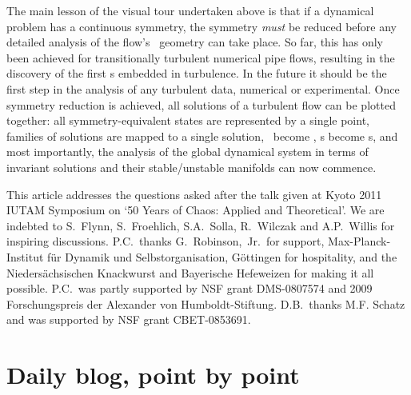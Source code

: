 \documentclass[aip,cha,reprint,
secnumarabic,
nofootinbib, tightenlines,
nobibnotes, showkeys, showpacs,
groupedaddress
]{revtex4-1}
\begin{document}
The main lesson of the visual tour undertaken above is that if a
dynamical problem has a continuous symmetry, the symmetry \emph{must} be
reduced before any detailed analysis of the flow's \statesp\ geometry can
take place. So far, this has only been achieved for transitionally
turbulent numerical pipe flows, resulting in the discovery of
the first \rpo s embedded in turbulence. In the future it should be the
first step in the analysis of any turbulent data, numerical or
experimental. Once symmetry reduction is achieved, all
solutions of a turbulent flow can be plotted together: all
symmetry-equivalent states are represented by a single point, families of
solutions are mapped to a single solution, \reqva\ become \eqva, \rpo s
become \po s, and most importantly, the analysis of the global dynamical
system in terms of invariant solutions and their stable/unstable
manifolds can now commence.

\begin{acknowledgments}
This article addresses the questions asked after the talk given at
Kyoto 2011 IUTAM Symposium on `50 Years of Chaos: Applied and Theoretical'.
We are indebted to
S.~Flynn,
S.~Froehlich,
S.A.~Solla,
R.~Wilczak
and
A.P.~Willis
for inspiring discussions.
P.C.\ thanks G.~Robinson,~Jr.\ for support,
Max-Planck-Institut f\"ur Dynamik und Selbstorganisation,
G\"ottingen for hospitality,
and the Nieders\"achsischen Knackwurst and Bayerische Hefeweizen for
making it all possible.
P.C.\ was partly supported by NSF grant DMS-0807574
and
2009 Forschungspreis der Alexander von Humboldt-Stiftung.
D.B.\ thanks M.F. Schatz and was supported by NSF grant CBET-0853691.
\end{acknowledgments}





\ifdraft
    \onecolumngrid

    \newpage

    \newpage

    \newpage
    \section{Daily blog, point by point}
    \label{chap:atlas}

\fi
\end{document}
